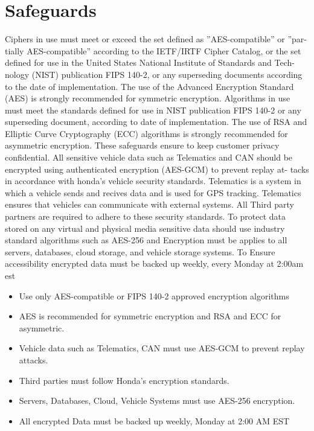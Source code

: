 \section{Safeguards}
Ciphers in use must meet or exceed the set defined as ”AES-compatible” or ”par-
tially AES-compatible” according to the IETF/IRTF Cipher Catalog, or the set
defined for use in the United States National Institute of Standards and Tech-
nology (NIST) publication FIPS 140-2, or any superseding documents according
to the date of implementation. The use of the Advanced Encryption Standard
(AES) is strongly recommended for symmetric encryption. Algorithms in use
must meet the standards defined for use in NIST publication FIPS 140-2 or any
superseding document, according to date of implementation. The use of RSA
and Elliptic Curve Cryptography (ECC) algorithms is strongly recommended
for asymmetric encryption. These safeguards ensure to keep customer privacy
confidential. All sensitive vehicle data such as Telematics and CAN should be
encrypted using authenticated encryption (AES-GCM) to prevent replay at-
tacks in accordance with honda’s vehicle security standards. Telematics is a
system in which a vehicle sends and recives data and is used for GPS tracking.
Telematics ensures that vehicles can communicate with external systems. All
Third party partners are required to adhere to these security standards. To
protect data stored on any virtual and physical media sensitive data should use
industry standard algorithms such as AES-256 and Encryption must be applies
to all servers, databases, cloud storage, and vehicle storage systems. To Ensure
accessibility encrypted data must be backed up weekly, every Monday at 2:00am
est

\begin{itemize}
    \item Use only AES-compatible or FIPS 140-2 approved encryption algorithms 
    \item AES is recommended for symmetric encryption and RSA and ECC for asymmetric. 
    \item Vehicle data such as Telematics, CAN must use AES-GCM to prevent replay attacks.
    \item Third parties must follow Honda's encryption standards.
    \item Servers, Databases, Cloud, Vehicle Systems must use AES-256 encryption. 
    \item All encrypted Data must be backed up weekly, Monday at 2:00 AM EST 
\end{itemize}
   

